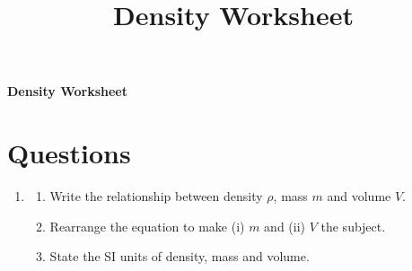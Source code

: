 \documentclass[11pt]{article}
\title{Density Worksheet}
\author{}
\date{}
\begin{document}
\begin{center}
    {\Large\bfseries Density Worksheet}
\end{center}

\vspace{-0.5em}

\section*{Questions}

\begin{enumerate}
\item 
\begin{enumerate}
    \item Write the relationship between density $\rho$, mass $m$ and volume $V$.
    \item Rearrange the equation to make (i) $m$ and (ii) $V$ the subject.
    \item State the SI units of density, mass and volume.
\end{enumerate}


\end{enumerate}
\end{document}
